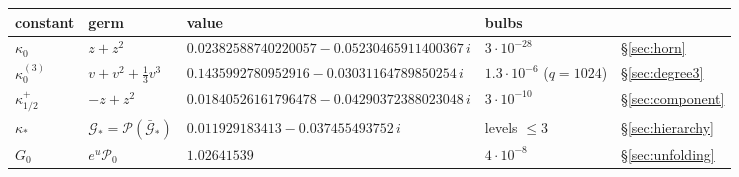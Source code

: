 \begin{tabular}{@{}lllll@{}}
\toprule
constant & germ & value & bulbs & \\
\midrule
$\kappa_0$ & $z+z^2$ & $0.02382588740220057 - 0.05230465911400367\,i$ & $3\cdot10^{-28}$ & \S\ref{sec:horn} \\
$\kappa_0^{(3)}$ & $v+v^2+\frac13v^3$ & $0.1435992780952916 - 0.03031164789850254\,i$ & $1.3\cdot10^{-6}$ ($q=1024$) & \S\ref{sec:degree3} \\
$\kappa^+_{1/2}$ & $-z+z^2$ & $0.01840526161796478 - 0.04290372388023048\,i$ & $3\cdot10^{-10}$ & \S\ref{sec:component} \\
$\kappa_*$ & $\mathcal G_*=\mathcal P(\bar{\mathcal G}_*)$ & $0.011929183413 - 0.037455493752\,i$ & levels $\le3$ & \S\ref{sec:hierarchy} \\
$G_0$ & $e^{u}\mathcal P_0$ & $1.02641539$ & $4\cdot10^{-8}$ & \S\ref{sec:unfolding} \\
\bottomrule
\end{tabular}
